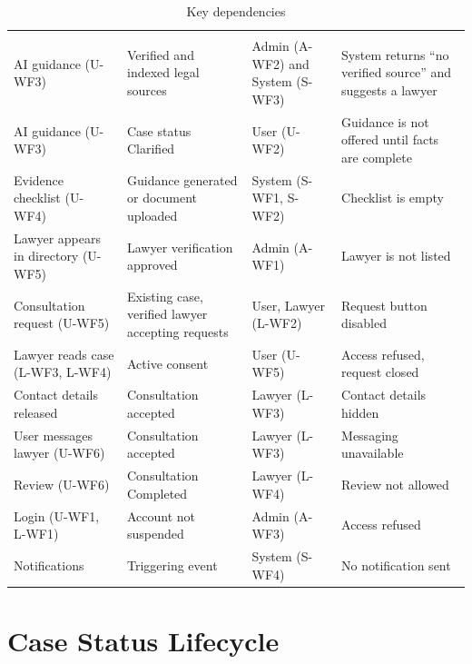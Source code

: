 \begin{longtable}{|L{3.54cm}|L{3.86cm}|L{2.42cm}|L{4.19cm}|}
\caption{Key dependencies}\label{tab:6.1}\\
\hline\headrow {} &  &  &  \\ \hline
\endfirsthead
\hline\headrow {} &  &  &  \\ \hline
\endhead
\hline\endlastfoot
AI guidance (U-WF3) & Verified and indexed legal sources & Admin (A-WF2) and System (S-WF3) & System returns ``no verified source'' and suggests a lawyer \\ \hline
AI guidance (U-WF3) & Case status Clarified & User (U-WF2) & Guidance is not offered until facts are complete \\ \hline
Evidence checklist (U-WF4) & Guidance generated or document uploaded & System (S-WF1, S-WF2) & Checklist is empty \\ \hline
Lawyer appears in directory (U-WF5) & Lawyer verification approved & Admin (A-WF1) & Lawyer is not listed \\ \hline
Consultation request (U-WF5) & Existing case, verified lawyer accepting requests & User, Lawyer (L-WF2) & Request button disabled \\ \hline
Lawyer reads case (L-WF3, L-WF4) & Active consent & User (U-WF5) & Access refused, request closed \\ \hline
Contact details released & Consultation accepted & Lawyer (L-WF3) & Contact details hidden \\ \hline
User messages lawyer (U-WF6) & Consultation accepted & Lawyer (L-WF3) & Messaging unavailable \\ \hline
Review (U-WF6) & Consultation Completed & Lawyer (L-WF4) & Review not allowed \\ \hline
Login (U-WF1, L-WF1) & Account not suspended & Admin (A-WF3) & Access refused \\ \hline
Notifications & Triggering event & System (S-WF4) & No notification sent \\
\end{longtable}

\section{Case Status Lifecycle}

